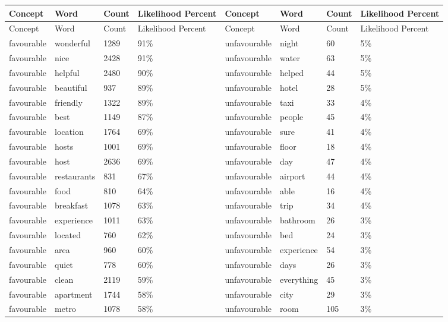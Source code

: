 \documentclass[a4paper, 12pt]{article}
\begin{document}
\newpage
\footnotesize
\begin{longtable}{p{2cm}p{2cm}p{1cm}p{1.6cm}p{2.4cm}p{1.9cm}p{1cm}p{2cm}}
Concept & Word & Count & Likelihood Percent & Concept & Word & Count & Likelihood Percent \\
\hline
\endfirsthead
Concept & Word & Count & Likelihood Percent & Concept & Word & Count & Likelihood Percent \\
\hline
\endhead
\endfoot
\endlastfoot

favourable & wonderful & 1289 & 91\% & unfavourable & night & 60 & 5\% \\
favourable & nice & 2428 & 91\% & unfavourable & water & 63 & 5\% \\
favourable & helpful & 2480 & 90\% & unfavourable & helped & 44 & 5\% \\
favourable & beautiful & 937 & 89\% & unfavourable & hotel & 28 & 5\% \\
favourable & friendly & 1322 & 89\% & unfavourable & taxi & 33 & 4\% \\
favourable & best & 1149 & 87\% & unfavourable & people & 45 & 4\% \\
favourable & location & 1764 & 69\% & unfavourable & sure & 41 & 4\% \\
favourable & hosts & 1001 & 69\% & unfavourable & floor & 18 & 4\% \\
favourable & host & 2636 & 69\% & unfavourable & day & 47 & 4\% \\
favourable & restaurants & 831 & 67\% & unfavourable & airport & 44 & 4\% \\
favourable & food & 810 & 64\% & unfavourable & able & 16 & 4\% \\
favourable & breakfast & 1078 & 63\% & unfavourable & trip & 34 & 4\% \\
favourable & experience & 1011 & 63\% & unfavourable & bathroom & 26 & 3\% \\
favourable & located & 760 & 62\% & unfavourable & bed & 24 & 3\% \\
favourable & area & 960 & 60\% & unfavourable & experience & 54 & 3\% \\
favourable & quiet & 778 & 60\% & unfavourable & days & 26 & 3\% \\
favourable & clean & 2119 & 59\% & unfavourable & everything & 45 & 3\% \\
favourable & apartment & 1744 & 58\% & unfavourable & city & 29 & 3\% \\
favourable & metro & 1078 & 58\% & unfavourable & room & 105 & 3\% \\

\end{longtable}
\end{document}
